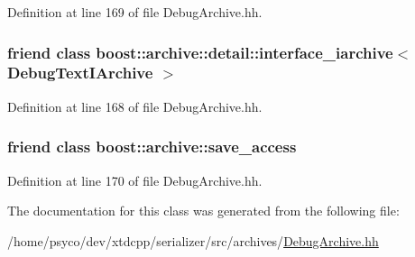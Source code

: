 Definition at line 169 of file Debug\+Archive.\+hh.

\subsubsection[{\texorpdfstring{boost\+::archive\+::detail\+::interface\+\_\+iarchive$<$ Debug\+Text\+I\+Archive $>$}{boost::archive::detail::interface_iarchive< DebugTextIArchive >}}]{\setlength{\rightskip}{0pt plus 5cm}friend class boost\+::archive\+::detail\+::interface\+\_\+iarchive$<$ {\bf Debug\+Text\+I\+Archive} $>$\hspace{0.3cm}{\ttfamily [friend]}}\hypertarget{classxtd_1_1serializer_1_1DebugTextIArchive_af9e30d7c11da39f8fdf5fd8c21e4e831}{}\label{classxtd_1_1serializer_1_1DebugTextIArchive_af9e30d7c11da39f8fdf5fd8c21e4e831}


Definition at line 168 of file Debug\+Archive.\+hh.

\subsubsection[{\texorpdfstring{boost\+::archive\+::save\+\_\+access}{boost::archive::save_access}}]{\setlength{\rightskip}{0pt plus 5cm}friend class boost\+::archive\+::save\+\_\+access\hspace{0.3cm}{\ttfamily [friend]}}\hypertarget{classxtd_1_1serializer_1_1DebugTextIArchive_aaca003bb8a4fc59424e4025130da4edd}{}\label{classxtd_1_1serializer_1_1DebugTextIArchive_aaca003bb8a4fc59424e4025130da4edd}


Definition at line 170 of file Debug\+Archive.\+hh.



The documentation for this class was generated from the following file\+:\begin{DoxyCompactItemize}
\item 
/home/psyco/dev/xtdcpp/serializer/src/archives/\hyperlink{DebugArchive_8hh}{Debug\+Archive.\+hh}\end{DoxyCompactItemize}
